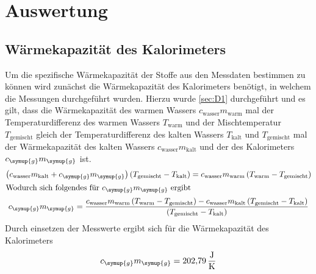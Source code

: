 \section{Auswertung}
\label{sec:Auswertung}
\subsection{Wärmekapazität des Kalorimeters}
Um die spezifische Wärmekapazität der Stoffe aus den Messdaten bestimmen
zu können wird zunächst die Wärmekapazität des Kalorimeters benötigt,
in welchem die Messungen durchgeführt wurden. Hierzu wurde \ref{sec:D1}
durchgeführt und es gilt, dass die Wärmekapazität des warmen Wassers
$c_\text{wasser}m_\text{warm}$ mal der Temperaturdifferenz des warmen Wassers
$T_\text{warm}$ und der Mischtemperatur $T_\text{gemischt}$ gleich der
Temperaturdifferenz des kalten Wassers $T_\text{kalt}$ und $T_\text{gemischt}$
mal der Wärmekapazität des kalten Wassers $c_\text{wasser}m_\text{kalt}$
und der des Kalorimeters $c_\symup{g}m_\symup{g}$ ist.
\begin{gather}
  \left(c_\text{wasser}m_\text{kalt}+c_\symup{g}m_\symup{g}\right)
  \left(T_\text{gemischt}-T_\text{kalt}\right)
  = c_\text{wasser}m_\text{warm}\left(T_\text{warm}-T_\text{gemischt}\right)\\
  \intertext{Wodurch sich folgendes für $c_\symup{g}m_\symup{g}$ ergibt}
  c_\symup{g}m_\symup{g} = \frac
  {c_\text{wasser}m_\text{warm}\left(T_\text{warm}-T_\text{gemischt}\right)
  -c_\text{wasser}m_\text{kalt}\left(T_\text{gemischt}-T_\text{kalt}\right)}
  {\left(T_\text{gemischt}-T_\text{kalt}\right)}
\end{gather}
Durch einsetzen der Messwerte ergibt sich für die Wärmekapazität des
Kalorimeters
\begin{equation*}
  c_\symup{g}m_\symup{g} = \SI{202,79}{\joule\per\kelvin}
\end{equation*}

